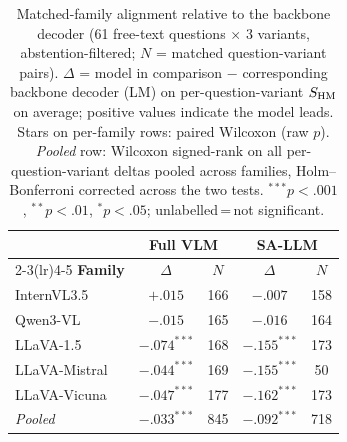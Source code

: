 \begin{table}[ht]
\centering\small\setlength{\tabcolsep}{5pt}
\begin{tabular}{l cc cc}
\toprule
& \multicolumn{2}{c}{\textbf{Full VLM}} & \multicolumn{2}{c}{\textbf{SA-LLM}} \\
\cmidrule(lr){2-3}\cmidrule(lr){4-5}
\textbf{Family} & $\Delta$ & $N$ & $\Delta$ & $N$ \\
\midrule
InternVL3.5 & $+.015$ & 166 & $-.007$ & 158 \\
Qwen3-VL & $-.015$ & 165 & $-.016$ & 164 \\
LLaVA-1.5 & $-.074^{***}$ & 168 & $-.155^{***}$ & 173 \\
LLaVA-Mistral & $-.044^{***}$ & 169 & $-.155^{***}$ & 50 \\
LLaVA-Vicuna & $-.047^{***}$ & 177 & $-.162^{***}$ & 173 \\
\midrule
\textit{Pooled} & $-.033^{***}$ & 845 & $-.092^{***}$ & 718 \\
\bottomrule
\end{tabular}
\caption{Matched-family alignment relative to the backbone decoder (61 free-text questions $\times$ 3 variants, abstention-filtered; $N$ = matched question-variant pairs).
$\Delta$ = model in comparison $-$ corresponding backbone decoder (LM) on per-question-variant $\sHM$ on average; positive values indicate the model leads.
Stars on per-family rows: paired Wilcoxon (raw $p$). \textit{Pooled} row: Wilcoxon signed-rank on all per-question-variant deltas pooled across families, Holm--Bonferroni corrected across the two tests. ${}^{***}p{<}.001$, ${}^{**}p{<}.01$, ${}^{*}p{<}.05$; unlabelled\,=\,not significant.}
\label{tab:matched_family_alignment_tests_ft_absf}
\end{table}